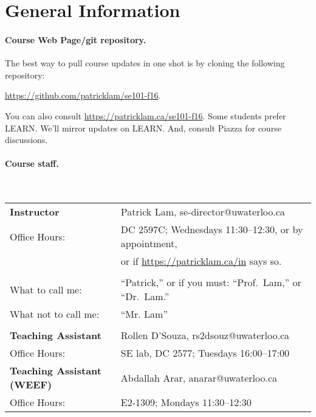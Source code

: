 \documentclass[11pt,onecolumn]{article}
\begin{document}
\section*{General Information}

\paragraph{Course Web Page/git repository.} 

The best way to pull course updates in one shot is by cloning the following repository:

\begin{center}
\url{https://github.com/patricklam/se101-f16}.
\end{center}

You can also consult \url{https://patricklam.ca/se101-f16}. Some students prefer LEARN. We'll mirror updates on LEARN. And, consult Piazza for course discussions.

\newpage
\paragraph{Course staff.}~\\[1em]
\begin{tabular}{ll}
{\bf Instructor} & Patrick Lam, se-director@uwaterloo.ca\\
Office Hours:& DC 2597C; Wednesdays 11:30--12:30, or by appointment,\\
& or if \url{https://patricklam.ca/in} says so.\\ \\

What to call me:& ``Patrick,'' or if you must: ``Prof.~Lam,'' or ``Dr.~Lam.''\\
What not to call me:& ``Mr. Lam''\\ \\

{\bf Teaching Assistant} &
Rollen D'Souza, rs2dsouz@uwaterloo.ca\\
Office Hours:& SE lab, DC 2577; Tuesdays 16:00--17:00\\[1em]
{\bf Teaching Assistant (WEEF)} &
Abdallah Arar, anarar@uwaterloo.ca\\
Office Hours:& E2-1309; Mondays 11:30--12:30 \\
\end{tabular}
\end{document}
